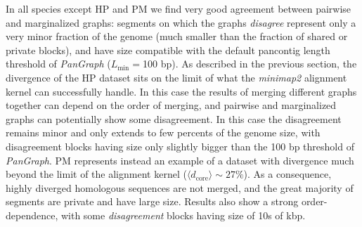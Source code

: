 \documentclass[aps,rmp,reprint,superscriptaddress,notitlepage,10pt,onecolumn]{revtex4-1}
\newcommand{\dcore}{\langle d_\text{core} \rangle}
\newcommand{\Lthr}{L_{\min}}
\begin{document}
In all species except HP and PM we find very good agreement between pairwise and marginalized graphs: segments on which the graphs \textit{disagree} represent only a very minor fraction of the genome (much smaller than the fraction of shared or private blocks), and have size compatible with the default pancontig length threshold of \textit{PanGraph} ($\Lthr =$100 bp).
As described in the previous section, the divergence of the HP dataset sits on the limit of what the \textit{minimap2} alignment kernel can successfully handle. In this case the results of merging different graphs together can depend on the order of merging, and pairwise and marginalized graphs can potentially show some disagreement. In this case the disagreement remains minor and only extends to few percents of the genome size, with disagreement blocks having size only slightly bigger than the 100 bp threshold of \textit{PanGraph}.
PM represents instead an example of a dataset with divergence much beyond the limit of the alignment kernel ($\dcore \sim 27 \%$). As a consequence, highly diverged homologous sequences are not merged, and the great majority of segments are private and have large size. Results also show a strong order-dependence, with some \textit{disagreement} blocks having size of 10s of kbp.
\end{document}
